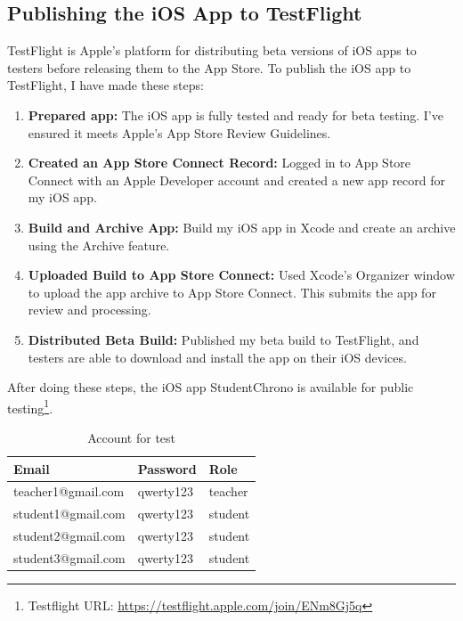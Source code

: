 \documentclass[
  biblatex = false,
  language=english,
  figures=false,
  sourcecodes,
  glossaries,
  index
]{kidiplom}
\begin{document}
\subsection{Publishing the iOS App to TestFlight}

TestFlight is Apple's platform for distributing beta versions of iOS apps to testers before releasing them to the App Store. To publish the iOS app to TestFlight, I have made these steps:

\begin{enumerate}
    \item \textbf{Prepared app:} The iOS app is fully tested and ready for beta testing. I've ensured it meets Apple's App Store Review Guidelines.
    \item \textbf{Created an App Store Connect Record:} Logged in to App Store Connect with an Apple Developer account and created a new app record for my iOS app.
    \item \textbf{Build and Archive App:} Build my iOS app in Xcode and create an archive using the Archive feature.    
    \item \textbf{Uploaded Build to App Store Connect:} Used Xcode's Organizer window to upload the app archive to App Store Connect. This submits the app for review and processing.
    \item \textbf{Distributed Beta Build:} Published my beta build to TestFlight, and testers are able to download and install the app on their iOS devices.
 \end{enumerate}
 
After doing these steps, the iOS app StudentChrono is available for public testing\footnote{Testflight URL: \url{https://testflight.apple.com/join/ENm8Gj5q}}.

\begin{table}[htbp]
    \centering
    \begin{tabular}{|l|l|l|}
        \hline
        Email & Password & Role \\
        \hline
        teacher1@gmail.com & qwerty123 & teacher \\
        student1@gmail.com & qwerty123 & student \\
        student2@gmail.com & qwerty123 & student \\
        student3@gmail.com & qwerty123 & student \\
        \hline
    \end{tabular}
    \caption{Account for test}
\end{table}
\end{document}
